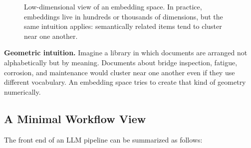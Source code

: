\documentclass[12pt]{article}
\begin{document}
\begin{figure}[ht]
    \centering
    \caption{Low-dimensional view of an embedding space. In practice, embeddings live in hundreds or thousands of dimensions, but the same intuition applies: semantically related items tend to cluster near one another.}
    \label{t15fig:embedding_cartoon}
\end{figure}

\begin{ex-box}
\textbf{Geometric intuition.} Imagine a library in which documents are arranged not alphabetically but by meaning. Documents about bridge inspection, fatigue, corrosion, and maintenance would cluster near one another even if they use different vocabulary. An embedding space tries to create that kind of geometry numerically.
\end{ex-box}

\subsection{A Minimal Workflow View}

The front end of an LLM pipeline can be summarized as follows:
\end{document}
